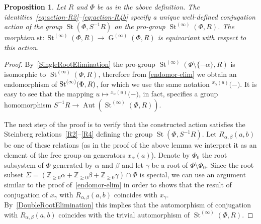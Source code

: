 \documentclass[oneside, 11pt]{amsart}
\numberwithin{equation}{section}
\newtheorem{prop}[lemma]{Proposition}
\theoremstyle{definition}
\theoremstyle{remark}
\DeclareMathOperator\St{St}
\DeclareMathOperator\GG{G}
\DeclareMathOperator\Aut{Aut}
\newcommand{\ZZ}{\mathbb{Z}}
\newcommand{\up}[2]{{^{#1}\!{#2}}}
\begin{document}
\begin{prop}\label{SteinbergLocalAction}
 Let $R$ and $\Phi$ be as in the above definition.
 The identities~\eqref{eq:action-R2}--\eqref{eq:action-R4b} specify a unique well-defined conjugation action of the group \(\St(\Phi, S^{-1} R)\) on the pro-group \(\St^{(\infty)}(\Phi, R)\).
 The morphism \(\mathrm{st} \colon \St^{(\infty)}(\Phi, R) \to \GG^{(\infty)}(\Phi, R)\) is equivariant with respect to this action.
\end{prop}
\begin{proof}
 By~\cref{SingleRootElimination} the pro-group $\St^{(\infty)}(\Phi\setminus\{-\alpha\}, R)$ is isomorphic to $\St^{(\infty)}(\Phi, R)$, therefore from \cref{endomor-elim} we obtain an endomorphism of $\St^{(\infty)}(\Phi,\- R)$, for which we use the same notation $\up{x_\alpha(u)}(-)$. It is easy to see that the mapping $u \mapsto \up{x_\alpha(u)}(-)$, in fact, specifies a group homomorphism $S^{-1}R \to \Aut(\St^{(\infty)}(\Phi, R))$. 
 
 The next step of the proof is to verify that the constructed action satisfies the Steinberg relations~\eqref{R2}--\eqref{R4} defining the group $\St(\Phi, S^{-1}R)$. Let $R_{\alpha, \beta}(a, b)$ be one of these relations (as in the proof of the above lemma we interpret it as an element of the free group on generators $x_\alpha(a)$). Denote by $\Phi_0$ the root subsystem of $\Phi$ generated by $\alpha$ and $\beta$ and let $\gamma$ be a root of $\Phi \setminus \Phi_0$. Since the root subset $\Sigma = (\ZZ_{\geq 0} \alpha + \ZZ_{\geq 0}\beta + \ZZ_{\geq 0}\gamma)\cap \Phi$ is special, we can use an argument similar to the proof of~\cref{endomor-elim} in order to shows that the result of conjugation of $x_\gamma$ with $R_{\alpha, \beta}(a, b)$ coincides with $x_\gamma$. By~\cref{DoubleRootElimination} this implies that the automorphism of conjugation with $R_{\alpha,\beta}(a, b)$ coincides with the trivial automorphism of $\St^{(\infty)}(\Phi, R)$.


\end{proof}
\end{document}
